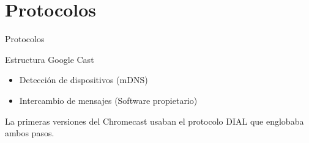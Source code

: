 \section{Protocolos}

\begin{frame}{Protocolos}
	\begin{block}{Estructura Google Cast}
		\begin{itemize}
			\item Detección de dispositivos (mDNS)
			\item Intercambio de mensajes (Software propietario)
		\end{itemize}
	\end{block}
	
	\begin{block}{ }
		La primeras versiones del Chromecast usaban el protocolo DIAL que englobaba ambos pasos.		
	\end{block}
\end{frame}













